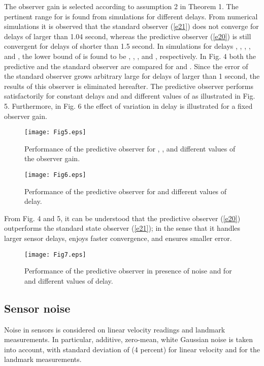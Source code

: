 \documentclass[12pt,draftcls,onecolumn]{IEEEtran}
\begin{document}
The observer gain  is  selected according to assumption 2 in Theorem 1. The pertinent range for  is found from simulations for different delays. From numerical simulations it is observed that the standard observer (\ref{e21}) does not converge for delays of larger than 1.04 second, whereas the predictive observer (\ref{e20}) is still convergent for delays of shorter than 1.5 second. In simulations for delays , , , , and , the lower bound of  is found to be , , , and , respectively.
In Fig. 4 both the predictive and the standard observer are compared for  and . Since the error of the standard observer grows arbitrary large for delays of larger than 1 second, the results of this observer is eliminated hereafter. The predictive observer performs satisfactorily for constant delays  and   and different values of  as illustrated in Fig. 5. Furthermore, in Fig. 6 the effect of variation in delay is illustrated for a fixed observer gain.
\begin{figure}[thpb] \label{F5}
\centering
\texttt{[image: Fig5.eps]}
\caption{Performance of the predictive observer for , , and different values of the observer gain.}
\end{figure}

\begin{figure}[thpb] \label{F6}
\centering
\texttt{[image: Fig6.eps]}
\caption{Performance of the predictive observer for  and different values of delay.}
\end{figure}
From Fig. 4 and 5, it can be understood that the predictive observer (\ref{e20}) outperforms the standard state observer (\ref{e21}); in the sense that it handles larger sensor delays, enjoys faster convergence, and ensures smaller error.

\begin{figure}[thpb]
\centering
\texttt{[image: Fig7.eps]}
\caption{Performance of the predictive observer in presence of noise and for  and different values of delay.}
\label{F7}
\end{figure}


 \subsection{Sensor noise} Noise in sensors is considered on linear velocity readings and landmark measurements. In particular, additive, zero-mean, white Gaussian noise is taken into account, with standard deviation of  (4 percent) for linear velocity and  for the landmark measurements.
\end{document}
